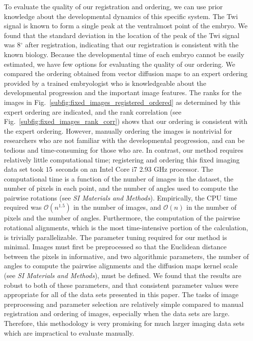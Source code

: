 \documentclass{pnastwo}
\newcommand{\SI}[0]{{\it SI Materials and Methods}}
\newcommand{\fig}[0]{Fig.}
\begin{document}
\begin{article}
To evaluate the quality of our registration and ordering, we can use prior knowledge about the developmental dynamics of this specific system. 
%
The Twi signal is known to form a single peak at the ventralmost point of the embryo. 
%
We found that the standard deviation in the location of the peak of the Twi signal was 8$^\circ$ after registration, indicating that our registration is consistent with the known biology. 
%
Because the developmental time of each embryo cannot be easily estimated, we have few options for evaluating the quality of our ordering. 
%
We compared the ordering obtained from vector diffusion maps to an expert ordering provided by a trained embryologist who is knowledgeable about the developmental progression and the important image features.  
%
The ranks for the images in \fig~\ref{subfig:fixed_images_registered_ordered} as determined by this expert ordering are indicated, and the rank correlation (see \fig~\ref{subfig:fixed_images_rank_corr}) shows that our ordering is consistent with the expert ordering. 
%
However, manually ordering the images is nontrivial for researchers who are not familiar with the developmental progression, and can be tedious and time-consuming for those who are.
%
In contrast, our method requires relatively little computational time; registering and ordering this fixed imaging data set took $15$~seconds on an Intel Core i7 2.93 GHz processor. %
%
The computational time is a function of the number of images in the dataset, the number of pixels in each point, and the number of angles used to compute the pairwise rotations (see \SI). 
%
Empirically, the CPU time required was $\mathcal{O}(n^{1.5})$ in the number of images, and $\mathcal{O}(n)$ in the number of pixels and the number of angles.
%
Furthermore, the computation of the pairwise rotational alignments, which is the most time-intensive portion of the calculation, is trivially parallelizable.
%
The parameter tuning required for our method is minimal.
%
Images must first be preprocessed so that the Euclidean distance between the pixels in informative, and two algorithmic parameters, the number of angles to compute the pairwise alignments and the diffusion maps kernel scale (see \SI), must be defined.
%
We found that the results are robust to both of these parameters, and that consistent parameter values were appropriate for all of the data sets presented in this paper. 
%
%
The tasks of image preprocessing and parameter selection are relatively simple compared to manual registration and ordering of images, especially when the data sets are large.  
%
Therefore, this methodology is very promising for much larger imaging data sets which are impractical to evaluate manually. 



\end{article}
\end{document}
